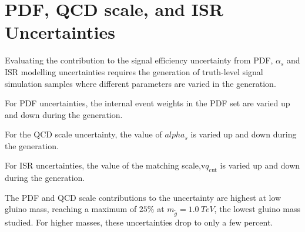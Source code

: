 \section{PDF, QCD scale, and ISR Uncertainties}\label{sec:signal_qcd_uncertainty}
Evaluating the contribution to the signal efficiency uncertainty from PDF, $\alpha_s$ and ISR modelling uncertainties
requires the generation of truth-level signal simulation samples where different parameters are varied in the generation.

For PDF uncertainties, the internal event weights in the PDF set are varied up and down during the generation.

For the QCD scale uncertainty, the value of $alpha_s$ is varied up and down during the generation.

For ISR uncertainties, the value of the matching scale,v$q_{\textrm{cut}}$ is varied up and down during the generation.

The PDF and QCD scale contributions to the uncertainty are highest at low gluino mass, reaching a maximum of $25\%$ at
$m_{\tilde{g}}=1.0~TeV$, the lowest gluino mass studied.
For higher masses, these uncertainties drop to only a few percent.
